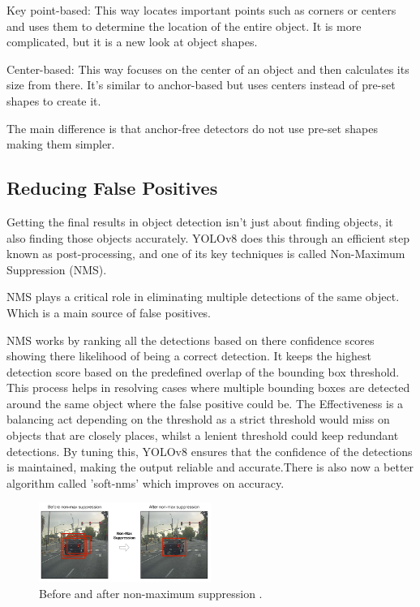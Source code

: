 \documentclass[11pt,journal,compsoc]{IEEEtran}
\begin{document}
Key point-based: This way locates important points such as corners or centers and uses them to determine the location of the entire object. It is more complicated, but it is a new look at object shapes.

Center-based: This way focuses on the center of an object and then calculates its size from there. It's similar to anchor-based but uses centers instead of pre-set shapes to create it.

The main difference is that anchor-free detectors do not use pre-set shapes making them simpler. 

\subsection{Reducing False Positives}
Getting the final results in object detection isn't just about finding objects, it also finding those objects accurately. YOLOv8 does this through an efficient step known as post-processing, and one of its key techniques is called Non-Maximum Suppression (NMS).

NMS plays a critical role in eliminating multiple detections of the same object. Which is a main source of false positives.

NMS\cite{NMS_Samb.k} works by ranking all the detections based on there confidence scores showing there likelihood of being a correct detection. It keeps the highest detection score based on the predefined overlap of the bounding box threshold. This process helps in resolving cases where multiple bounding boxes are detected around the same object where the false positive could be. The Effectiveness is a balancing act depending on the threshold as a strict threshold would miss on objects that are closely places, whilst a lenient threshold could keep redundant detections. By tuning this, YOLOv8 ensures that the confidence of the detections is maintained, making the output reliable and accurate.There is also now a better algorithm called 'soft-nms'\cite{bodla2017soft} which improves on accuracy.

\begin{figure}[ht]
\centering
\includegraphics[width=0.5\textwidth]{images/NMS_Before_After.png}
\caption{Before and after non-maximum suppression \cite{NMS_Samb.k}.}
\label{fig:nms}
\end{figure}
\end{document}
